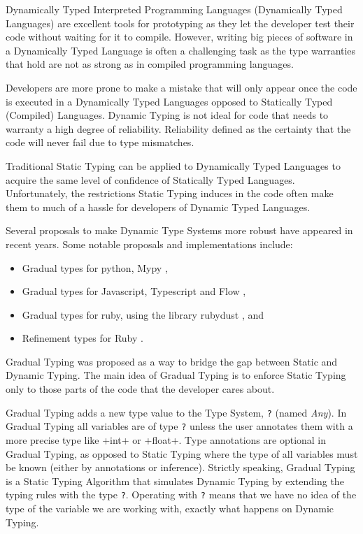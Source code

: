 Dynamically Typed Interpreted Programming Languages (Dynamically Typed Languages) are
excellent tools for prototyping as they let the developer test their code without waiting
for it to compile. However, writing big pieces of software in a Dynamically Typed Language
is often a challenging task as the type warranties that hold are not as strong as in
compiled programming languages.

Developers are more prone to make a mistake that will only appear once
the code is executed in a Dynamically Typed Languages opposed to
Statically Typed (Compiled) Languages. Dynamic Typing is not ideal for
code that needs to warranty a high degree of reliability. Reliability
defined as the certainty that the code will never fail due to type
mismatches.

Traditional Static Typing can be applied to Dynamically Typed Languages
to acquire the same level of confidence of Statically Typed Languages.
Unfortunately, the restrictions Static Typing induces in the code often
make them to much of a hassle for developers of Dynamic Typed Languages.

Several proposals to make Dynamic Type Systems more robust have appeared
in recent years. Some notable proposals and implementations include:

\begin{itemize}
\tightlist
\item
  Gradual types for python, Mypy \autocite{lehtosalo2016mypy},
\item
  Gradual types for Javascript, Typescript
  \autocites{bierman2014understanding}{hejlsberg2012introducing} and
  Flow \autocite{chaudhuri2016flow},
\item
  Gradual types for ruby, using the library rubydust
  \autocite{an_dynamic_2011}, and
\item
  Refinement types for Ruby \autocite{kazerounian_refinement_2017}.
\end{itemize}

Gradual Typing \autocite{siek_gradual_2006} was proposed as a way to
bridge the gap between Static and Dynamic Typing. The main idea of
Gradual Typing is to enforce Static Typing only to those parts of the
code that the developer cares about.

Gradual Typing adds a new type value to the Type System, \texttt{?}
(named \emph{Any}). In Gradual Typing all variables are of type
\texttt{?} unless the user annotates them with a more precise type like
\pycode+int+ or \pycode+float+. Type annotations are optional in Gradual
Typing, as opposed to Static Typing where the type of all variables must
be known (either by annotations or inference). Strictly speaking,
Gradual Typing is a Static Typing Algorithm that simulates Dynamic
Typing by extending the typing rules with the type \texttt{?}. Operating
with \texttt{?} means that we have no idea of the type of the variable
we are working with, exactly what happens on Dynamic Typing.

